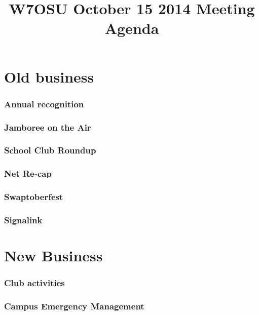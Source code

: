 \documentclass[10pt,letterpaper]{article}
\title{W7OSU October 15 2014 Meeting Agenda}
\begin{document}
 
\maketitle

\part*{Old business}
\section{Annual recognition}
\section{Jamboree on the Air}
\section{School Club Roundup}
\section{Net Re-cap}
\section{Swaptoberfest}
\section{Signalink}
\part*{New Business}
\section{Club activities}
\section{Campus Emergency Management}
\end{document}
